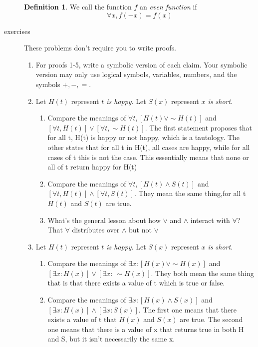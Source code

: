 \documentclass{letter}
\theoremstyle{definition}
\newtheorem*{definition}{Definition}
\begin{document}
\begin{description}
\begin{definition}
	We call the function $f$ an {\em even function} if $$\forall x, f(-x)=f(x)$$
\end{definition}
\item[exercises] These problems don't require you to write proofs.
\begin{enumerate}
	\item For proofs 1-5, write a symbolic version of each claim. Your symbolic version may only use logical symbols, variables, numbers, and the symbols $+,-,=$.
	\item Let $H(t)$ represent {\em $t$ is happy}. Let $S(x)$ represent {\em $x$ is short}.
		\begin{enumerate}
			\item Compare the meanings of $\forall t, \left[H(t)\vee \sim H(t)\right]$ and $\left[\forall t, H(t)\right] \vee \left[\forall t,\sim H(t)\right]$.
The first statement proposes that for all t, H(t) is happy or not happy, which is a tautology. The other states that for all t in H(t), all cases are happy, while for all cases of t this is not the case. This essentially means that none or all of t return happy for H(t) 
			\item Compare the meanings of $\forall t, \left[H(t)\wedge S(t)\right]$ and $\left[\forall t, H(t)\right]\wedge \left[\forall t, S(t)\right]$.
They mean the same thing,for all t $H(t)$ and $S(t)$ are true.
			\item What's the general lesson about how $\vee$ and $\wedge$ interact with $\forall$? \\
                          That $\forall$ distributes over $\wedge$ but not $\vee$
		\end{enumerate} 
	\item Let $H(t)$ represent {\em $t$ is happy}. Let $S(x)$ represent {\em $x$ is short}.
		\begin{enumerate}
			\item Compare the meanings of $\exists x:\left[H(x)\vee \sim H(x)\right]$ and $\left[\exists x: H(x)\right] \vee \left[\exists x:\ \sim H(x)\right]$.
                          They both mean the same thing that is that there exists a value of t which is true or false.
			\item Compare the meanings of $\exists x: \left[H(x)\wedge S(x)\right]$ and $\left[\exists x: H(x)\right]\wedge \left[\exists x: S(x)\right]$. The first one means that there exists a value of t that $H(x)$ and $S(x)$ are true. The second one means that there is a value of x that returns true in both H and S, but it isn't necessarily the same x.
                          

\end{enumerate}
\end{enumerate}
\end{description}
\end{document}
